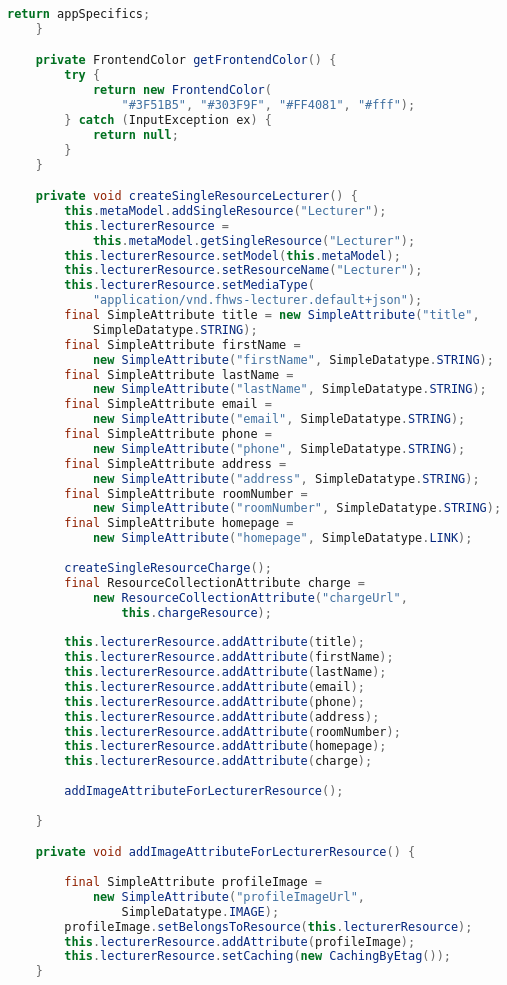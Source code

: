 \begin{lstlisting}[label=lst:enfield_model,
language=java,
firstnumber=1,
caption=Beschreibung des \textit{Enfield-Modell} der Referenzimplementierung. ]
		return appSpecifics;
	}

	private FrontendColor getFrontendColor() {
		try {
			return new FrontendColor(
				"#3F51B5", "#303F9F", "#FF4081", "#fff");
		} catch (InputException ex) {
			return null;
		}
	}

	private void createSingleResourceLecturer() {
		this.metaModel.addSingleResource("Lecturer");
		this.lecturerResource =
			this.metaModel.getSingleResource("Lecturer");
		this.lecturerResource.setModel(this.metaModel);
		this.lecturerResource.setResourceName("Lecturer");
		this.lecturerResource.setMediaType(
			"application/vnd.fhws-lecturer.default+json");
		final SimpleAttribute title = new SimpleAttribute("title", 
			SimpleDatatype.STRING);
		final SimpleAttribute firstName = 
			new SimpleAttribute("firstName", SimpleDatatype.STRING);
		final SimpleAttribute lastName = 
			new SimpleAttribute("lastName", SimpleDatatype.STRING);
		final SimpleAttribute email = 
			new SimpleAttribute("email", SimpleDatatype.STRING);
		final SimpleAttribute phone = 
			new SimpleAttribute("phone", SimpleDatatype.STRING);
		final SimpleAttribute address = 
			new SimpleAttribute("address", SimpleDatatype.STRING);
		final SimpleAttribute roomNumber = 
			new SimpleAttribute("roomNumber", SimpleDatatype.STRING);
		final SimpleAttribute homepage = 
			new SimpleAttribute("homepage", SimpleDatatype.LINK);
		
		createSingleResourceCharge();
		final ResourceCollectionAttribute charge = 
			new ResourceCollectionAttribute("chargeUrl",
				this.chargeResource);
	
		this.lecturerResource.addAttribute(title);
		this.lecturerResource.addAttribute(firstName);
		this.lecturerResource.addAttribute(lastName);
		this.lecturerResource.addAttribute(email);
		this.lecturerResource.addAttribute(phone);
		this.lecturerResource.addAttribute(address);
		this.lecturerResource.addAttribute(roomNumber);
		this.lecturerResource.addAttribute(homepage);
		this.lecturerResource.addAttribute(charge);
		
		addImageAttributeForLecturerResource();
		
	}

	private void addImageAttributeForLecturerResource() {
	
		final SimpleAttribute profileImage = 
			new SimpleAttribute("profileImageUrl",
				SimpleDatatype.IMAGE);
		profileImage.setBelongsToResource(this.lecturerResource);
		this.lecturerResource.addAttribute(profileImage);
		this.lecturerResource.setCaching(new CachingByEtag());
	}


\end{lstlisting}
